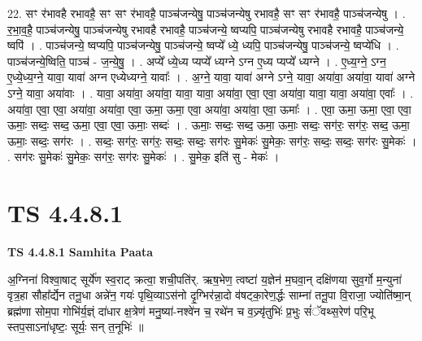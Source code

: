 \documentclass[17pt]{extarticle}
\begin{document}
22. सꣳ र॑भावहै रभावहै॒ सꣳ सꣳ र॑भावहै॒ पाञ्च॑जन्येषु॒ पाञ्च॑जन्येषु रभावहै॒ सꣳ सꣳ र॑भावहै॒ पाञ्च॑जन्येषु । . र॒भा॒व॒है॒ पाञ्च॑जन्येषु॒ पाञ्च॑जन्येषु रभावहै रभावहै॒ पाञ्च॑जन्ये॒ ष्वप्यपि॒ पाञ्च॑जन्येषु रभावहै रभावहै॒ पाञ्च॑जन्ये॒ ष्वपि॑ । . पाञ्च॑जन्ये॒ ष्वप्यपि॒ पाञ्च॑जन्येषु॒ पाञ्च॑जन्ये॒ ष्वप्ये᳚ ध्ये॒ ध्यपि॒ पाञ्च॑जन्येषु॒ पाञ्च॑जन्ये॒ ष्वप्ये॑धि । . पाञ्च॑जन्ये॒ष्विति॒ पाञ्च॑ - ज॒न्ये॒षु॒ । . अप्ये᳚ ध्ये॒ध्य प्यप्ये᳚ ध्यग्ने ऽग्न ए॒ध्य प्यप्ये᳚ ध्यग्ने । . ए॒ध्य॒ग्ने॒ ऽग्न॒ ए॒ध्ये॒ध्य॒ग्ने॒ यावा॒ यावा॑ अग्न एध्येध्यग्ने॒ यावाः᳚ । . अ॒ग्ने॒ यावा॒ यावा॑ अग्ने ऽग्ने॒ यावा॒ अया॑वा॒ अया॑वा॒ यावा॑ अग्ने ऽग्ने॒ यावा॒ अया॑वाः । . यावा॒ अया॑वा॒ अया॑वा॒ यावा॒ यावा॒ अया॑वा॒ एवा॒ एवा॒ अया॑वा॒ यावा॒ यावा॒ अया॑वा॒ एवाः᳚ । . अया॑वा॒ एवा॒ एवा॒ अया॑वा॒ अया॑वा॒ एवा॒ ऊमा॒ ऊमा॒ एवा॒ अया॑वा॒ अया॑वा॒ एवा॒ ऊमाः᳚ । . एवा॒ ऊमा॒ ऊमा॒ एवा॒ एवा॒ ऊमाः॒ सब्दः॒ सब्द॒ ऊमा॒ एवा॒ एवा॒ ऊमाः॒ सब्दः॑ । . ऊमाः॒ सब्दः॒ सब्द॒ ऊमा॒ ऊमाः॒ सब्दः॒ सग॑रः॒ सग॑रः॒ सब्द॒ ऊमा॒ ऊमाः॒ सब्दः॒ सग॑रः । . सब्दः॒ सग॑रः॒ सग॑रः॒ सब्दः॒ सब्दः॒ सग॑रः सु॒मेकः॑ सु॒मेकः॒ सग॑रः॒ सब्दः॒ सब्दः॒ सग॑रः सु॒मेकः॑ । . सग॑रः सु॒मेकः॑ सु॒मेकः॒ सग॑रः॒ सग॑रः सु॒मेकः॑ । . सु॒मेक॒ इति॑ सु - मेकः॑ । \newline
\pagebreak
{}

\section{ TS 4.4.8.1 }

\textbf{TS 4.4.8.1 } \newline
\textbf{Samhita Paata} \newline

अ॒ग्निना॑ विश्वा॒षाट् सूर्ये॑ण स्व॒राट् क्रत्वा॒ शची॒पति॑र्. ऋष॒भेण॒ त्वष्टा॑ य॒ज्ञेन॑ म॒घवा॒न् दक्षि॑णया सुव॒र्गो म॒न्युना॑ वृत्र॒हा सौहा᳚र्द्येन तनू॒धा अन्ने॑न॒ गयः॑ पृथि॒व्याऽस॑नो दृ॒ग्भिर॑न्ना॒दो व॑षट्का॒रेण॒र्द्धः साम्ना॑ तनू॒पा वि॒राजा॒ ज्योति॑ष्मा॒न् ब्रह्म॑णा सोम॒पा गोभि॑र्य॒ज्ञ्ं दा॑धार क्ष॒त्रेण॑ मनु॒ष्या॑-नश्वे॑न च॒ रथे॑न च व॒ज्र्यृ॑तुभिः॑ प्र॒भुः सं॑ॅवथ्स॒रेण॑ परि॒भू स्तप॒साऽना॑धृष्टः॒ सूर्यः॒ सन् त॒नूभिः॑ ॥ \newline
\end{document}
